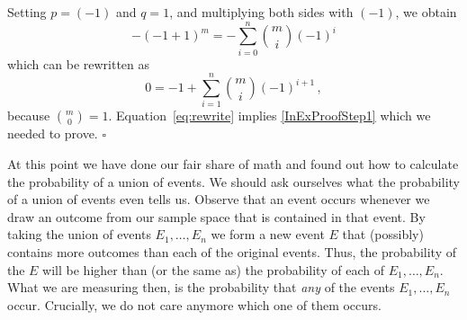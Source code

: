 Setting $p=(-1)$ and $q=1$, and multiplying both sides with $(-1)$, we obtain
\[
-(-1+1)^m = - \sum_{i=0}^n \binom{m}{i} (-1)^{i}
\]
which can be rewritten as
\begin{equation} \label{eq:rewrite}
0 = -1 + \sum_{i=1}^n \binom{m}{i} (-1)^{i+1} \, ,
\end{equation}
because $\binom{m}{0} = 1$. Equation~\eqref{eq:rewrite} implies \eqref{InExProofStep1} which we needed to prove. $ \square $\bigskip
%
%
%
%

At this point we have done our fair share of math and found out how to calculate the probability of a union
of events. We should ask ourselves what the probability of a union of events even tells us. Observe that an event 
occurs whenever we draw an outcome from our sample space that is contained in that event. By taking the union
of events $ E_{1}, \ldots, E_{n} $ we form a new event $ E $ that (possibly) contains more outcomes than each 
of the original events. Thus, the probability of the $ E $ will be higher than (or the same as) the 
probability of each of $ E_{1}, \ldots, E_{n} $. What we are measuring then, is the probability that 
\textit{any} of the events $ E_{1}, \ldots, E_{n} $ occur. Crucially, we do not care anymore which one of them
occurs.

